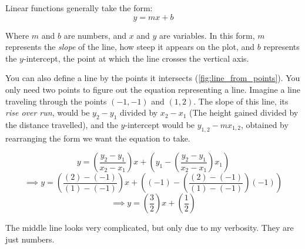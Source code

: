 \documentclass{tufte-book}
\begin{document}
Linear functions generally take the form:
\begin{equation*}
	y = mx + b
\end{equation*}
\begin{marginfigure}[+1cm]
	\caption{A linear function.}
	\label{fig:line}
\end{marginfigure}
Where $m$ and $b$ are numbers, and $x$ and $y$ are variables. In this form, $m$ represents the \emph{slope} of the line,
how steep it appears on the plot, and $b$ represents the $y$-intercept, the point at which the line crosses the
vertical axis.

You can also define a line by the points it intersects (\cref{fig:line_from_points}). You only need two points to figure out the equation
representing a line. Imagine a line traveling through the points $(-1,-1)$ and $(1,2)$. The slope of this line, its
\emph{rise over run}, would be $y_2-y_1$ divided by $x_2-x_1$ (The height gained divided by the distance travelled),
and the $y$-intercept would be $y_{1,2}-mx_{1,2}$, obtained by rearranging the form we want the equation to take.

\begin{equation*}
	y=\left(\dfrac{y_2-y_1}{x_2-x_1}\right)x+\left(y_1-\left(\dfrac{y_2-y_1}{x_2-x_1}\right)x_1\right)
\end{equation*}
\begin{equation*}
	\implies y=\left(\dfrac{(2)-(-1)}{(1)-(-1)}\right)x+\left((-1)-\left(\dfrac{(2)-(-1)}{(1)-(-1)}\right)(-1)\right)
\end{equation*}
\begin{equation*}
	\implies y=\left(\dfrac{3}{2}\right)x+\left(\dfrac12\right)
\end{equation*}
\begin{marginfigure}[-8cm]
	\caption{$(-1,-1)$ and $(1,2)$ and $y=1.5x+0.5$}
	\label{fig:line_from_points}
\end{marginfigure}
The middle line looks very complicated, but only due to my verbosity. They are just numbers.
\end{document}
